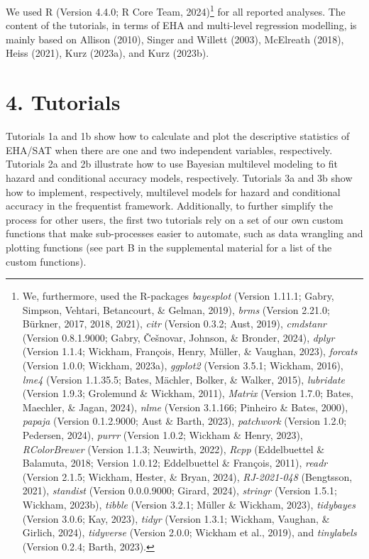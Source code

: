\documentclass[
  man, donotrepeattitle,floatsintext]{apa6}
\begin{document}
We used R (Version 4.4.0; R Core Team, 2024)\footnote{We, furthermore, used the R-packages \emph{bayesplot} (Version 1.11.1; Gabry, Simpson, Vehtari, Betancourt, \& Gelman, 2019), \emph{brms} (Version 2.21.0; Bürkner, 2017, 2018, 2021), \emph{citr} (Version 0.3.2; Aust, 2019), \emph{cmdstanr} (Version 0.8.1.9000; Gabry, Češnovar, Johnson, \& Bronder, 2024), \emph{dplyr} (Version 1.1.4; Wickham, François, Henry, Müller, \& Vaughan, 2023), \emph{forcats} (Version 1.0.0; Wickham, 2023a), \emph{ggplot2} (Version 3.5.1; Wickham, 2016), \emph{lme4} (Version 1.1.35.5; Bates, Mächler, Bolker, \& Walker, 2015), \emph{lubridate} (Version 1.9.3; Grolemund \& Wickham, 2011), \emph{Matrix} (Version 1.7.0; Bates, Maechler, \& Jagan, 2024), \emph{nlme} (Version 3.1.166; Pinheiro \& Bates, 2000), \emph{papaja} (Version 0.1.2.9000; Aust \& Barth, 2023), \emph{patchwork} (Version 1.2.0; Pedersen, 2024), \emph{purrr} (Version 1.0.2; Wickham \& Henry, 2023), \emph{RColorBrewer} (Version 1.1.3; Neuwirth, 2022), \emph{Rcpp} (Eddelbuettel \& Balamuta, 2018; Version 1.0.12; Eddelbuettel \& François, 2011), \emph{readr} (Version 2.1.5; Wickham, Hester, \& Bryan, 2024), \emph{RJ-2021-048} (Bengtsson, 2021), \emph{standist} (Version 0.0.0.9000; Girard, 2024), \emph{stringr} (Version 1.5.1; Wickham, 2023b), \emph{tibble} (Version 3.2.1; Müller \& Wickham, 2023), \emph{tidybayes} (Version 3.0.6; Kay, 2023), \emph{tidyr} (Version 1.3.1; Wickham, Vaughan, \& Girlich, 2024), \emph{tidyverse} (Version 2.0.0; Wickham et al., 2019), and \emph{tinylabels} (Version 0.2.4; Barth, 2023).} for all reported analyses. The content of the tutorials, in terms of EHA and multi-level regression modelling, is mainly based on Allison (2010), Singer and Willett (2003), McElreath (2018), Heiss (2021), Kurz (2023a), and Kurz (2023b).

\section{4. Tutorials}\label{tutorials}

Tutorials 1a and 1b show how to calculate and plot the descriptive statistics of EHA/SAT when there are one and two independent variables, respectively. Tutorials 2a and 2b illustrate how to use Bayesian multilevel modeling to fit hazard and conditional accuracy models, respectively. Tutorials 3a and 3b show how to implement, respectively, multilevel models for hazard and conditional accuracy in the frequentist framework.
Additionally, to further simplify the process for other users, the first two tutorials rely on a set of our own custom functions that make sub-processes easier to automate, such as data wrangling and plotting functions (see part B in the supplemental material for a list of the custom functions).
\end{document}
